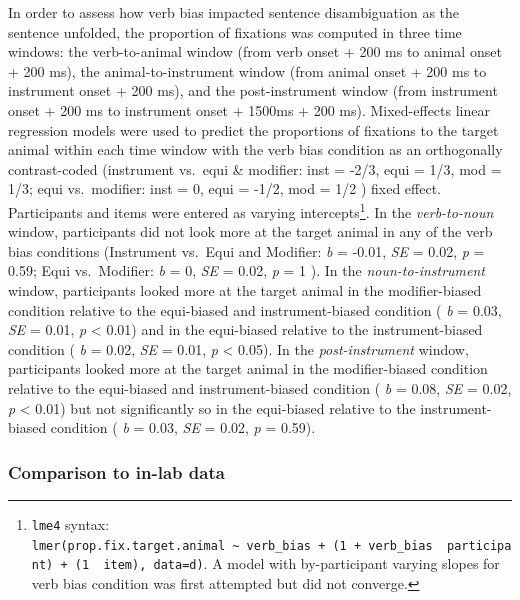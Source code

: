 \documentclass[
  english,
  man,floatsintext]{apa6}
\begin{document}
In order to assess how verb bias impacted sentence disambiguation as the sentence unfolded, the proportion of fixations was computed in three time windows: the verb-to-animal window (from verb onset + 200 ms to animal onset + 200 ms), the animal-to-instrument window (from animal onset + 200 ms to instrument onset + 200 ms), and the post-instrument window (from instrument onset + 200 ms to instrument onset + 1500ms + 200 ms). Mixed-effects linear regression models were used to predict the proportions of fixations to the target animal within each time window with the verb bias condition as an orthogonally contrast-coded (instrument vs.~equi \& modifier: inst = -2/3, equi = 1/3, mod = 1/3; equi vs.~modifier: inst = 0, equi = -1/2, mod = 1/2 ) fixed effect. Participants and items were entered as varying intercepts\footnote{\texttt{lme4} syntax: \texttt{lmer(prop.fix.target.animal\ \textasciitilde{}\ verb\_bias\ +\ (1\ +\ verb\_bias\ \textbar{}\ participant)\ +\ (1\ \textbar{}\ item),\ data=d)}. A model with by-participant varying slopes for verb bias condition was first attempted but did not converge.}. In the \emph{verb-to-noun} window, participants did not look more at the target animal in any of the verb bias conditions (Instrument vs.~Equi and Modifier: \emph{b} = -0.01, \emph{SE} = 0.02, \emph{p} = 0.59; Equi vs.~Modifier: \emph{b} = 0, \emph{SE} = 0.02, \emph{p} = 1 ). In the \emph{noun-to-instrument} window, participants looked more at the target animal in the modifier-biased condition relative to the equi-biased and instrument-biased condition ( \emph{b} = 0.03, \emph{SE} = 0.01, \emph{p} \textless{} 0.01) and in the equi-biased relative to the instrument-biased condition ( \emph{b} = 0.02, \emph{SE} = 0.01, \emph{p} \textless{} 0.05). In the \emph{post-instrument} window, participants looked more at the target animal in the modifier-biased condition relative to the equi-biased and instrument-biased condition ( \emph{b} = 0.08, \emph{SE} = 0.02, \emph{p} \textless{} 0.01) but not significantly so in the equi-biased relative to the instrument-biased condition ( \emph{b} = 0.03, \emph{SE} = 0.02, \emph{p} = 0.59).

\hypertarget{comparison-to-in-lab-data-1}{%
\subsubsection{Comparison to in-lab data}\label{comparison-to-in-lab-data-1}}
\end{document}
